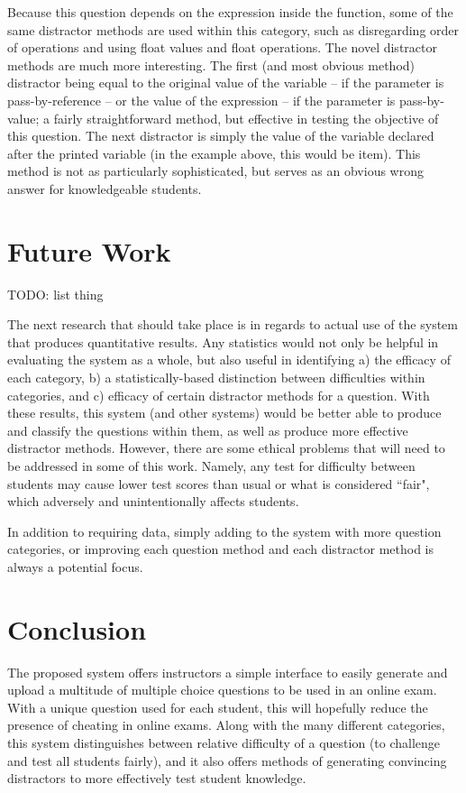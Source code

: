 \documentclass{article}
\begin{document}
Because this question depends on the expression inside the function, some of the same distractor methods are used within this category, such as disregarding order of operations and
using float values and float operations. The novel distractor methods are much more interesting.
The first (and most obvious method) distractor being equal to the original value of the variable -- if the parameter is pass-by-reference -- or the value of the expression -- if the parameter is pass-by-value; a fairly straightforward method, but effective in testing the objective of this question. 
The next distractor is simply the value of the variable declared after the printed variable (in the example above, this would be item). This method is not as particularly sophisticated, but serves as an obvious wrong answer for knowledgeable students. 

\section{Future Work} \label{sec-future_work}

TODO: list thing

The next research that should take place is in regards to actual use of the system that produces quantitative results. Any statistics would not only be helpful in evaluating the system as a whole, but also useful in identifying a) the efficacy of each category, b) a statistically-based distinction between difficulties within categories, and c) efficacy of certain distractor methods for a question. With these results, this system (and other systems) would be better able to produce and classify the questions within them, as well as produce more effective distractor methods. However, there are some ethical problems that will need to be addressed in some of this work. Namely, any test for difficulty between students may cause lower test scores than usual or what is considered ``fair", which adversely and unintentionally affects students. 

In addition to requiring data, simply adding to the system with more question categories, or improving each question method and each distractor method is always a potential focus.

\section{Conclusion} \label{sec-conclusion}

The proposed system offers instructors a simple interface to easily generate and upload a multitude of multiple choice questions to be used in an online exam. With a unique question used for each student, this will hopefully reduce the presence of cheating in online exams. Along with the many different categories, this system distinguishes between relative difficulty of a question (to challenge and test all students fairly), and it also offers methods of generating convincing distractors to more effectively test student knowledge. 
\end{document}
